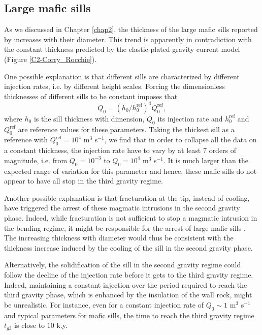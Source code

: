 \subsection{Large mafic sills}
\label{C4-sec:large-mafic-sill}

As we  discussed in  Chapter \ref{chap2}, the  thickness of  the large
mafic  sills  reported  by   \citet{Cruden:tg}  increases  with  their
diameter. This trend is apparently  in contradiction with the constant
thickness  predicted  by  the  elastic-plated  gravity  current  model
(Figure \ref{C2-Corry_Rocchie}).  

One possible explanation is that  different sills are characterized by
different injection rates, i.e.   by different height scales.  Forcing
the  dimensionless  thicknesses  of  different sills  to  be  constant
imposes that
\begin{equation}
  Q_0 = (h_0/h_0^{\text{ref}})^4Q_0^{\text{ref}},
\end{equation}
where $h_0$ is the sill  thickness with dimension, $Q_0$ its injection
rate  and  $h_0^{\text{ref}}$  and  $Q_0^{\text{ref}}$  are  reference
values for these parameters.  Taking  the thickest sill as a reference
with $Q_0^{\text{ref}} =  10^4$ m$^3$ s$^{-1}$, we find  that in order
to collapse all  the data on a constant thickness,  the injection rate
have  to  vary by  at  least  $7$  orders  of magnitude,  i.e.   from
$Q_0=10^{-3}$ to $Q_0= 10^{4}$ m$^3$  s$^{-1}$. It is much larger than
the expected range  of variation for this parameter  and hence, these
mafic  sills do  not appear  to  have all  stop in  the third  gravity
regime.

Another possible explanation is that  fracturation at the tip, instead
of cooling, have triggered the  arrest of these magmatic intrusions in
the  second   gravity  phase.   Indeed,  while   fracturation  is  not
sufficient  to stop  a magmatic  intrusion in  the bending  regime, it
might   be  responsible   for  the   arrest  of   large  mafic   sills
\citep{Michaut:2011kg}.  The increasing  thickness with diameter would
thus be consistent with the  thickness increase induced by the cooling
of the sill in the second gravity phase.

Alternatively, the  solidification of the  sill in the  second gravity
regime could follow  the decline of the injection rate  before it gets
to the third gravity regime.  Indeed, maintaining a constant injection
over the  period required to reach  the third gravity phase,  which is
enhanced by the insulation of the wall rock, might be unrealistic. For
instance,  even for  a constant  injection rate  of $Q_0\sim  1$ m$^3$
s$^{-1}$ and typical parameters for mafic sills, the time to reach the
third gravity regime $t_{g3}$ is close to $10$ k.y.


